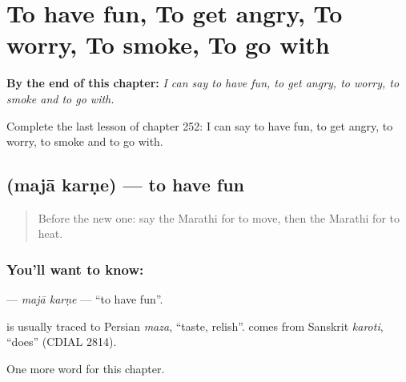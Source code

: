 
\chapter{To have fun, To get angry, To worry, To smoke, To go with}
\label{ch:mr-to-have-fun-to-get-angry-to-worry-to-smoke-to-go-with}

\begin{chapteropening}
\textbf{By the end of this chapter:} \emph{I can say to have fun, to get angry, to worry, to smoke and to go with.}

Complete the last lesson of chapter 252: I can say to have fun, to get angry, to worry, to smoke and to go with.
\end{chapteropening}

\section[\texorpdfstring{\mr{मजा} \mr{करणे} (majā karṇe)}{मजा करणे (majā karṇe)}]{  (majā karṇe) — to have fun}

\label{lesson:MR-C252-maja-karne}



\begin{quote}
Before the new one: say the Marathi for to move, then the Marathi for to heat.
\end{quote}

\subsection*{You'll want to know:  }
\textbf{ } — \emph{majā karṇe} — \textquotedblleft{}to have fun\textquotedblright{}.

\begin{cousinweb}
\textbf{} is usually traced to Persian \emph{maza}, \textquotedblleft{}taste, relish\textquotedblright{}. \textbf{} comes from Sanskrit \emph{karoti}, \textquotedblleft{}does\textquotedblright{} (CDIAL 2814).
\end{cousinweb}

\begin{grammarlens}[title={What you've built}]
One more word for this chapter.
\end{grammarlens}


